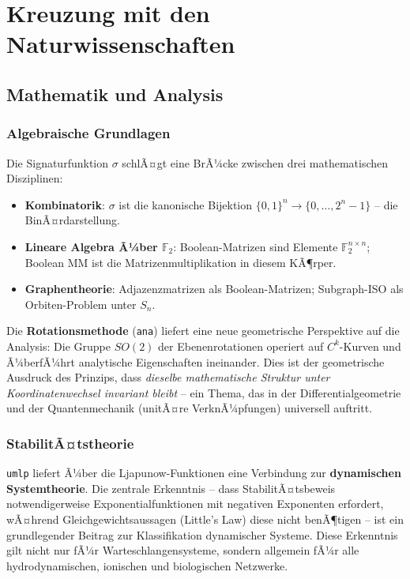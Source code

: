 ﻿\documentclass[a4paper,12pt]{scrreprt}
\theoremstyle{definition}
\begin{document}
\section{Kreuzung mit den Naturwissenschaften}
\label{sec:cross_science}

\subsection{Mathematik und Analysis}

\subsubsection{Algebraische Grundlagen}

Die Signaturfunktion $\sigma$ schlÃ¤gt eine BrÃ¼cke zwischen drei
mathematischen Disziplinen:

\begin{itemize}
  \item \textbf{Kombinatorik}: $\sigma$ ist die kanonische Bijektion
    $\{0,1\}^n \to \{0, \ldots, 2^n-1\}$ -- die BinÃ¤rdarstellung.
  \item \textbf{Lineare Algebra Ã¼ber $\mathbb{F}_2$}: Boolean-Matrizen
    sind Elemente $\mathbb{F}_2^{n \times n}$; Boolean MM ist die
    Matrizenmultiplikation in diesem KÃ¶rper.
  \item \textbf{Graphentheorie}: Adjazenzmatrizen als Boolean-Matrizen;
    Subgraph-ISO als Orbiten-Problem unter $S_n$.
\end{itemize}

Die \textbf{Rotationsmethode} (\texttt{ana}) liefert eine neue geometrische
Perspektive auf die Analysis: Die Gruppe $SO(2)$ der Ebenenrotationen
operiert auf $C^k$-Kurven und Ã¼berfÃ¼hrt analytische Eigenschaften ineinander.
Dies ist der geometrische Ausdruck des Prinzips, dass \emph{dieselbe
mathematische Struktur unter Koordinatenwechsel invariant bleibt} --
ein Thema, das in der Differentialgeometrie und der Quantenmechanik
(unitÃ¤re VerknÃ¼pfungen) universell auftritt.

\subsubsection{StabilitÃ¤tstheorie}

\texttt{umlp} liefert Ã¼ber die Ljapunow-Funktionen eine Verbindung zur
\textbf{dynamischen Systemtheorie}. Die zentrale Erkenntnis -- dass
StabilitÃ¤tsbeweis notwendigerweise Exponentialfunktionen mit negativen
Exponenten erfordert, wÃ¤hrend Gleichgewichtsaussagen (Little's Law) diese
nicht benÃ¶tigen -- ist ein grundlegender Beitrag zur Klassifikation
dynamischer Systeme. Diese Erkenntnis gilt nicht nur fÃ¼r Warteschlangensysteme,
sondern allgemein fÃ¼r alle hydrodynamischen, ionischen und biologischen
Netzwerke.
\end{document}
